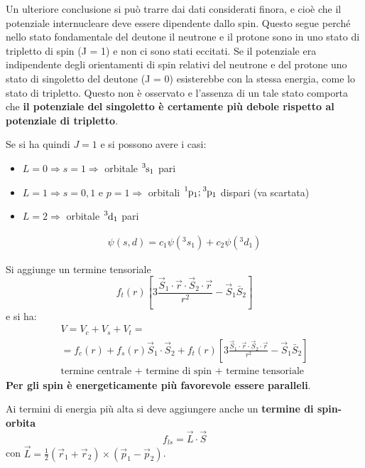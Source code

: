 \documentclass[a4paper,11pt,twoside,openany]{book}
\theoremstyle{definition}
\theoremstyle{plain}
\theoremstyle{plain}
\theoremstyle{definition}
\begin{document}
Un ulteriore conclusione si può trarre dai dati considerati finora, e cioè che il potenziale internucleare deve essere dipendente dallo spin. Questo segue perché nello stato fondamentale del deutone il neutrone e il protone sono in uno stato di tripletto di spin (J = 1) e non ci sono stati eccitati. Se il potenziale era indipendente degli orientamenti di spin relativi del neutrone e del protone uno stato di singoletto del deutone (J = 0) esisterebbe con la stessa energia, come lo stato di tripletto. Questo non è osservato e l'assenza di un tale stato comporta che \textbf{il potenziale del singoletto è certamente più debole rispetto al potenziale di tripletto}.

Se si ha quindi $J=1$ e si possono avere i casi:
\begin{itemize}
\item $L=0 \Longrightarrow s=1 \Longrightarrow$ orbitale $\ce{^3s_1}$ pari
\item $L=1 \Longrightarrow s=0,1$ e $p=1 \Longrightarrow $ orbitali $ \ce{^1p_1}; \ce{^3p_1}$ dispari (va scartata)
\item $L=2 \Longrightarrow $ orbitale $ \ce{^3d_1}$ pari
\end{itemize}

\begin{equation}\begin{split}
\psi \left(s,d\right)=c_1\psi \left({^3s_1}\right)+c_2\psi \left({^3d_1}\right)
\end{split}\end{equation}

Si aggiunge un termine tensoriale $$f_t\left(r\right)\left[3\frac{\vec S_1\cdot \vec r\cdot \vec S_2\cdot \vec r}{r^2}-\vec S_1\bar S_2\right]$$ e si ha:
\begin{equation}\begin{split}
V=V_c+V_s+V_t=\\
=f_c\left(r\right)+f_s\left(r\right)\vec S_1\cdot \vec S_2+f_t\left(r\right)\left[3\frac{\vec S_1\cdot \vec r\cdot \vec S_2\cdot \vec r}{r^2}-\vec S_1\bar S_2\right]\\
\textrm{termine centrale + termine di spin + termine tensoriale}
\end{split}\end{equation}
\textbf{Per gli spin è energeticamente più favorevole essere paralleli}.

Ai termini di energia più alta si deve aggiungere anche un \textbf{termine di spin-orbita} $$f_{ls}=\vec L\cdot \vec S$$ con $\vec L=\frac{1}{2}\left(\vec r_1+\vec r_2\right)\times \left(\vec p_1-\vec p_2\right)$.
\end{document}
